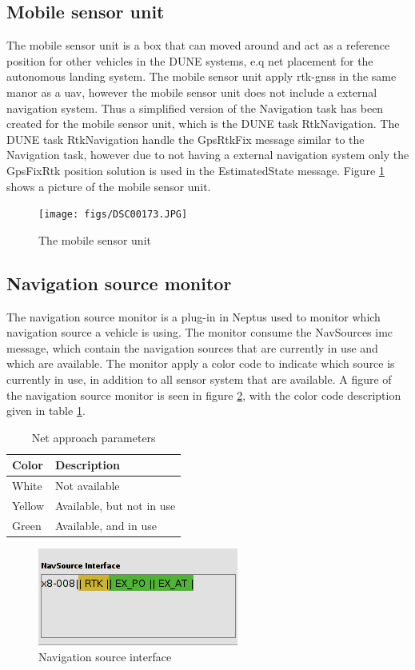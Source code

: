 \subsection{Mobile sensor unit}
The mobile sensor unit is a box that can moved around and act as a reference position for other vehicles in the DUNE systems, e.q net placement for the autonomous landing system. The mobile sensor unit apply \gls{rtk-gnss} in the same manor as a \gls{uav}, however the mobile sensor unit does not include a external navigation system. Thus a simplified version of the Navigation task has been created for the mobile sensor unit, which is the DUNE task RtkNavigation. The DUNE task RtkNavigation handle the GpsRtkFix message similar to the Navigation task, however due to not having a external navigation system only the GpsFixRtk position solution is used in the EstimatedState message. Figure \ref{Fig:MobileSensor} shows a picture of the mobile sensor unit.
\begin{figure}[H]
\centering
\texttt{[image: figs/DSC00173.JPG]}
\caption{The mobile sensor unit}
\label{Fig:MobileSensor}
\end{figure}
\subsection{Navigation source monitor}
The navigation source monitor is a plug-in in Neptus used to monitor which navigation source a vehicle is using. The monitor consume the NavSources \gls{imc} message, which contain the navigation sources that are currently in use and which are available. The monitor apply a color code to indicate which source is currently in use, in addition to all sensor system that are available. A figure of the navigation source monitor is seen in figure \ref{Fig:NavsourceInterface}, with the color code description given in table \ref{Tb:Color Code}.
\begin{table}[H]
\begin{center}
    \begin{tabular}{ | l | l |}
    \hline
    \textbf{Color} & \textbf{Description} \\ \hline
    White & Not available \\ \hline
    Yellow & Available, but not in use \\ \hline
    Green & Available, and in use \\ \hline
    \end{tabular}
\end{center}
\caption{Net approach parameters }
\label{Tb:Color Code}
\end{table}
\begin{figure}[H]
\centering
\includegraphics[scale=0.6]{figs/NavSourceInterface.png}
\caption{Navigation source interface}
\label{Fig:NavsourceInterface}
\end{figure}
